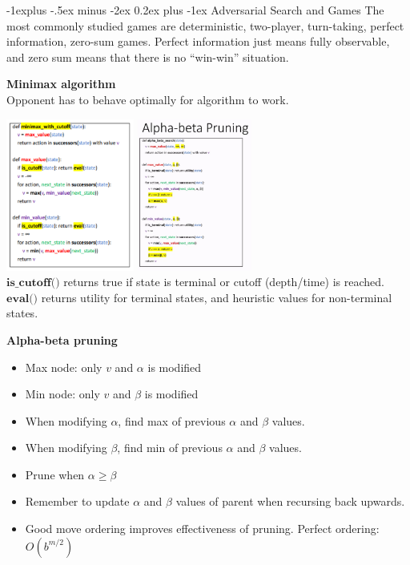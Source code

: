 \documentclass[10pt,landscape]{article}
\makeatletter
\renewcommand{\subsection}{\@startsection{subsection}{2}{0mm}%
                                {-1explus -.5ex minus -2ex}%
                                {0.2ex plus -1ex}%
                                {\normalfont\small\bfseries}}
\makeatother
\begin{document}
\begin{multicols}{3}
\begin{scriptsize}

\subsection{Adversarial Search and Games}
The most commonly studied games are deterministic, two-player, turn-taking, perfect information, zero-sum games.
Perfect information just means fully observable, and zero 
sum means that there is no “win-win” situation.

\textbf{Minimax algorithm}\\
Opponent has to behave optimally for algorithm to work.

\includegraphics[height= 5cm, width=0.4\linewidth]{minimax_cutoff.png}
\includegraphics[height= 5cm, width=0.5\linewidth]{alpha_beta_pruning.png}
\\ $\textbf{is\_cutoff()}$ returns true if state is terminal or cutoff (depth/time) is reached.
\\ $\textbf{eval()}$ returns utility for terminal states, and heuristic values for non-terminal states.

\textbf{Alpha-beta pruning}\\
\begin{itemize}
  \item Max node: only $v$ and $\alpha$ is modified
  \item Min node: only $v$ and $\beta$ is modified
  \item When modifying $\alpha$, find max of previous $\alpha$ and $\beta$ values.
  \item When modifying $\beta$, find min of previous $\alpha$ and $\beta$ values.
  \item Prune when $\alpha \geq \beta$
  \item Remember to update $\alpha$ and $\beta$ values of parent when recursing back upwards.
  \item Good move ordering improves effectiveness of pruning. Perfect ordering: $O(b^{m/2})$
\end{itemize}


\end{scriptsize}
\end{multicols}
\end{document}
